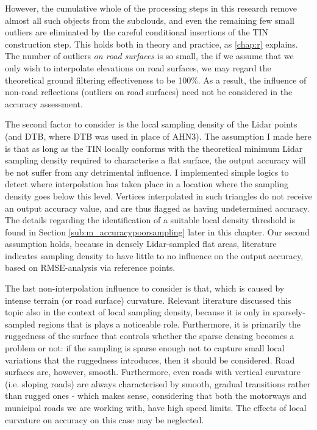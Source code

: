 However, the cumulative whole of the processing steps in this research remove almost all such objects from the subclouds, and even the remaining few small outliers are eliminated by the careful conditional insertions of the TIN construction step. This holds both in theory and practice, as \ref{chap:r} explains. The number of outliers \textit{on road surfaces} is so small, the if we assume that we only wish to interpolate elevations on road surfaces, we may regard the theoretical ground filtering effectiveness to be 100\%. As a result, the influence of non-road reflections (outliers on road surfaces) need not be considered in the accuracy assessment.

The second factor to consider is the local sampling density of the Lidar points (and DTB, where DTB was used in place of AHN3). The assumption I made here is that as long as the TIN locally conforms with the theoretical minimum Lidar sampling density required to characterise a flat surface, the output accuracy will be not suffer from any detrimental influence. I implemented simple logics to detect where interpolation has taken place in a location where the sampling density goes below this level. Vertices interpolated in such triangles do not receive an output accuracy value, and are thus flagged as having undetermined accuracy. The details regarding the identification of a suitable local density threshold is found in Section \ref{sub:m_accuracypoorsampling} later in this chapter. Our second assumption holds, because in densely Lidar-sampled flat areas, literature indicates sampling density to have little to no influence on the output accuracy, based on RMSE-analysis via reference points.

The last non-interpolation influence to consider is that, which is caused by intense terrain (or road surface) curvature. Relevant literature discussed this topic also in the context of local sampling density, because it is only in sparsely-sampled regions that is plays a noticeable role. Furthermore, it is primarily the ruggedness of the surface that controls whether the sparse densing becomes a problem or not: if the sampling is sparse enough not to capture small local variations that the ruggedness introduces, then it should be considered. Road surfaces are, however, smooth. Furthermore, even roads with vertical curvature (i.e. sloping roads) are always characterised by smooth, gradual transitions rather than rugged ones - which makes sense, considering that both the motorways and municipal roads we are working with, have high speed limits. The effects of local curvature on accuracy on this case may be neglected.

